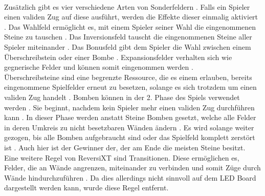 \documentclass[12pt,a4paper]{article}
\begin{document}
\vspace{1ex}\\ 
Zusätzlich gibt es vier verschiedene Arten von Sonderfeldern \cite{ReversiXT:Doku}. Falls ein Spieler einen validen Zug auf diese ausführt, werden die Effekte dieser einmalig aktiviert \cite{ReversiXT:Doku}. Das Wahlfeld ermöglicht es, mit einem Spieler seiner Wahl die eingenommenen Steine zu tauschen \cite{ReversiXT:Doku}. Das Inversionsfeld tauscht die eingenommenen Steine aller Spieler miteinander \cite{ReversiXT:Doku}. Das Bonusfeld gibt dem Spieler die Wahl zwischen einem Überschreibstein oder einer Bombe \cite{ReversiXT:Doku}. Expansionsfelder verhalten sich wie gegnerische Felder und können somit eingenommen werden \cite{ReversiXT:Doku}. 
\vspace{1ex}\\ 
Überschreibsteine sind eine begrenzte Ressource, die es einem erlauben, bereits eingenommene Spielfelder erneut zu besetzen, solange es sich trotzdem um einen validen Zug handelt \cite{ReversiXT:Doku}. Bomben können in der 2. Phase des Spiels verwendet werden \cite{ReversiXT:Doku}. Sie beginnt, nachdem kein Spieler mehr einen validen Zug durchführen kann \cite{ReversiXT:Doku}. In dieser Phase werden anstatt Steine Bomben gesetzt, welche alle Felder in deren Umkreis zu nicht besetzbaren Wänden ändern \cite{ReversiXT:Doku}. Es wird solange weiter gezogen, bis alle Bomben aufgebraucht sind oder das Spielfeld komplett zerstört ist \cite{ReversiXT:Doku}. Auch hier ist der Gewinner der, der am Ende die meisten Steine besitzt.
\vspace{1ex}\\
Eine weitere Regel von ReversiXT sind Transitionen. Diese ermöglichen es, Felder, die an Wände angrenzen, miteinander zu verbinden und somit Züge durch Wände hindurchzuführen \cite{ReversiXT:Doku}. Da dies allerdings nicht sinnvoll auf dem LED Board dargestellt werden kann, wurde diese Regel entfernt.
\end{document}
